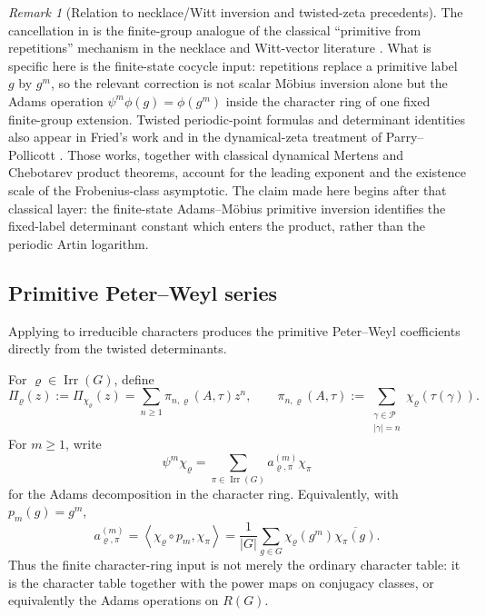 \documentclass[11pt,a4paper]{amsart}
\theoremstyle{plain}
\theoremstyle{definition}
\theoremstyle{remark}
\newtheorem{remark}[theorem]{Remark}
\DeclareMathOperator{\Irr}{Irr}
\newcommand{\cP}{\mathcal P}
\begin{document}
\begin{remark}[Relation to necklace/Witt inversion and twisted-zeta
  precedents]
  \label{rem:adams-mobius-literature-position}
  The cancellation in
   is the finite-group analogue
  of the classical ``primitive from repetitions'' mechanism in the
  necklace and Witt-vector literature
  \cite{MetropolisRota1983Necklaces,Wehrhahn1990AperiodicRings}. What
  is specific here is the finite-state cocycle input:
  repetitions replace a primitive label \(g\) by \(g^m\), so the
  relevant correction is not scalar M\"obius inversion alone but the
  Adams operation \(\psi^m\phi(g)=\phi(g^m)\) inside the character ring
  of one fixed finite-group extension. Twisted periodic-point formulas
  and determinant identities also appear in Fried's work
  \cite{Fried1983PeriodicPointsTwistedCoefficients,Fried1983HomologicalIdentitiesClosedOrbits} and in the dynamical-zeta
  treatment of Parry--Pollicott \cite{ParryPollicott1990Zeta}. Those
  works, together with classical dynamical Mertens and Chebotarev product
  theorems, account for the leading exponent and the existence scale of the
  Frobenius-class asymptotic.  The claim made here begins after that classical
  layer: the finite-state Adams--M\"obius primitive inversion identifies the
  fixed-label determinant constant which enters the product, rather than the
  periodic Artin logarithm.
\end{remark}
\subsection{Primitive Peter--Weyl series}

Applying  to irreducible
characters produces the primitive Peter--Weyl coefficients directly
from the twisted determinants.

For \(\varrho\in\Irr(G)\), define
\begin{equation}\label{eq:primitive-peter-weyl-series}
  \Pi_\varrho(z):=\Pi_{\chi_\varrho}(z)
  =\sum_{n\ge 1}\pi_{n,\varrho}(A,\tau)z^n,
  \qquad
  \pi_{n,\varrho}(A,\tau)
  :=\sum_{\substack{\gamma\in\cP\\ |\gamma|=n}}
    \chi_\varrho(\tau(\gamma)).
\end{equation}
For \(m\ge 1\), write
\begin{equation}\label{eq:adams-character-decomposition}
  \psi^m\chi_\varrho
  =\sum_{\pi\in\Irr(G)}a_{\varrho,\pi}^{(m)}\chi_\pi
\end{equation}
for the Adams decomposition in the character ring. Equivalently, with
\(p_m(g)=g^m\),
\begin{equation}\label{eq:adams-coefficient-inner-product}
  a_{\varrho,\pi}^{(m)}
  =
  \left\langle \chi_\varrho\circ p_m,\chi_\pi\right\rangle
  =
  \frac{1}{|G|}\sum_{g\in G}
    \chi_\varrho(g^m)\overline{\chi_\pi(g)}.
\end{equation}
Thus the finite character-ring input is not merely the ordinary
character table: it is the character table together with the power maps
on conjugacy classes, or equivalently the Adams operations on \(R(G)\).
\end{document}
